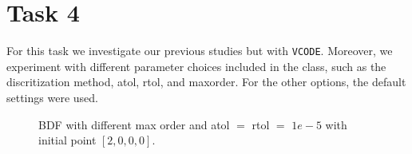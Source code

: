 \documentclass{article}
\begin{document}
\section{Task 4}
For this task we investigate our previous studies but with \texttt{VCODE}. Moreover, we experiment with different parameter choices included in the class, such as the discritization method, atol, rtol, and maxorder. For the other options, the default settings were used.
\begin{figure}[H]
\centering
{}\hfill
{}\hfill
\caption{BDF with different max order and atol $=$ rtol $=$ $1e-5$ with initial point \(\left[2,0,0,0\right]\).} \label{Fig4_1}
\end{figure}
\end{document}
